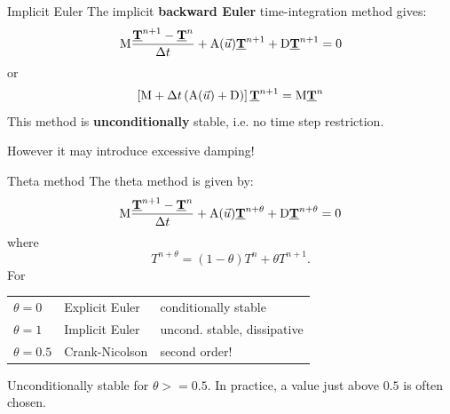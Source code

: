 \documentclass[12pt]{beamer}
\newcommand\mat[1]{\mathrm{#1}}
\newcommand\dv[1]{\underline{\bf #1}} %
\newcommand\vT{\dv T}
\renewcommand\emph[1]{{\bf #1}}
\begin{document}
\begin{frame}{Implicit Euler}
  The implicit \emph{backward Euler} time-integration method gives:
  \begin{equation*}
    \mat M\frac{\vT^{n+1}-\vT^n}{\Delta t} 
    + \mat A(\vec u) \vT^{n+1} + \mat D \vT^{n+1} = 0
  \end{equation*}
  or
  \begin{equation*}
    \left[ \mat M + \Delta t\left(\mat A(\vec u) + \mat D\right) \right] \vT^{n+1} = \mat M \vT^n 
  \end{equation*}
  This method is \emph{unconditionally} stable, i.e. no time step restriction.

  \vspace{1em}
  However it may introduce excessive damping!
\end{frame}

\begin{frame}{Theta method}
  The theta method is given by:
  \begin{equation*}
    \mat M\frac{\vT^{n+1}-\vT^n}{\Delta t} 
    + \mat A(\vec u) \vT^{n+\theta} + \mat D
    \vT^{n+\theta} = 0
  \end{equation*}
  where
  \begin{equation*}
    T^{n+\theta}=(1-\theta) T^n + \theta T^{n+1}.
  \end{equation*}
  For %
  \begin{tabular}{lll}
    $\theta=0$ & Explicit Euler & conditionally stable \\
    $\theta=1$ & Implicit Euler & uncond. stable, dissipative\hspace{-4em}\;\\
    $\theta=0.5$ & Crank-Nicolson & second order!
  \end{tabular}

  \vspace{1em}
  Unconditionally stable for $\theta>=0.5$. In practice, a value just above
  $0.5$ is often chosen.
\end{frame}
\end{document}
